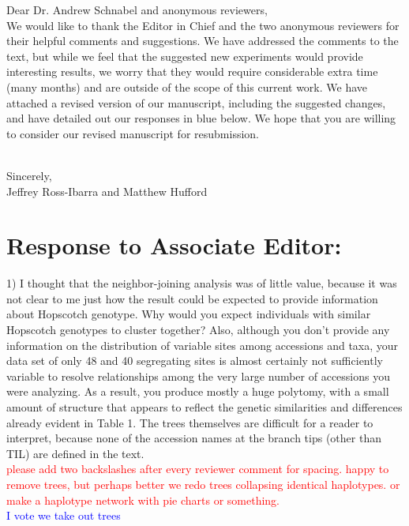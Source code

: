 \documentclass[11pt]{article}
\newcommand{\res}[1]{\noindent \textcolor{blue}{{#1}} \\}
\newcommand{\jri}[1]{\noindent \textcolor{red}{{#1}} \\}
\begin{document}
\noindent Dear Dr. Andrew Schnabel and anonymous reviewers, \\

We would like to thank the Editor in Chief and the two anonymous reviewers for their helpful comments and suggestions. We have addressed the comments to the text, but while we feel that the suggested new experiments would provide interesting results, we worry that they would require considerable extra time (many months) and are outside of the scope of this current work.  We have attached a revised version of our manuscript, including the suggested changes, and have detailed out our responses in blue below. We hope that you are willing to consider our revised manuscript for resubmission.\\\

\noindent Sincerely,\\

Jeffrey Ross-Ibarra and Matthew Hufford

\section*{Response to Associate Editor:}


1) I thought that the neighbor-joining analysis was of little value, because it was not clear to me just how the result could be expected to provide information about Hopscotch genotype.  Why would you expect individuals with similar Hopscotch genotypes to cluster together?  Also, although you don’t provide any information on the distribution of variable sites among accessions and taxa, your data set of only 48 and 40 segregating sites is almost certainly not sufficiently variable to resolve relationships among the very large number of accessions you were analyzing.  As a result, you produce mostly a huge polytomy, with a small amount of structure that appears to reflect the genetic similarities and differences already evident in Table 1.  The trees themselves are difficult for a reader to interpret, because none of the accession names at the branch tips (other than TIL) are defined in the text.\\

\jri{please add two backslashes after every reviewer comment for spacing. happy to remove trees, but perhaps better we redo trees collapsing identical haplotypes. or  make a haplotype network with pie charts or something.}
\res{I vote we take out trees}
\end{document}
